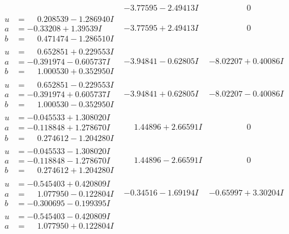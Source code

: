 \documentclass[1p]{elsarticle_modified}
\theoremstyle{definition}
\begin{document}
$$\begin{array}{c|c|c}
 & -3.77595 - 2.49413 I & \phantom{-0.000000 } 0 \\ \hline\begin{aligned}
u &= \phantom{-}0.208539 - 1.286940 I \\
a &= -0.33208 + 1.39539 I \\
b &= \phantom{-}0.471474 - 1.286510 I\end{aligned}
 & -3.77595 + 2.49413 I & \phantom{-0.000000 } 0 \\ \hline\begin{aligned}
u &= \phantom{-}0.652851 + 0.229553 I \\
a &= -0.391974 - 0.605737 I \\
b &= \phantom{-}1.000530 + 0.352950 I\end{aligned}
 & -3.94841 - 0.62805 I & -8.02207 + 0.40086 I \\ \hline\begin{aligned}
u &= \phantom{-}0.652851 - 0.229553 I \\
a &= -0.391974 + 0.605737 I \\
b &= \phantom{-}1.000530 - 0.352950 I\end{aligned}
 & -3.94841 + 0.62805 I & -8.02207 - 0.40086 I \\ \hline\begin{aligned}
u &= -0.045533 + 1.308020 I \\
a &= -0.118848 + 1.278670 I \\
b &= \phantom{-}0.274612 - 1.204280 I\end{aligned}
 & \phantom{-}1.44896 + 2.66591 I & \phantom{-0.000000 } 0 \\ \hline\begin{aligned}
u &= -0.045533 - 1.308020 I \\
a &= -0.118848 - 1.278670 I \\
b &= \phantom{-}0.274612 + 1.204280 I\end{aligned}
 & \phantom{-}1.44896 - 2.66591 I & \phantom{-0.000000 } 0 \\ \hline\begin{aligned}
u &= -0.545403 + 0.420809 I \\
a &= \phantom{-}1.077950 - 0.122804 I \\
b &= -0.300695 - 0.199395 I\end{aligned}
 & -0.34516 - 1.69194 I & -0.65997 + 3.30204 I \\ \hline\begin{aligned}
u &= -0.545403 - 0.420809 I \\
a &= \phantom{-}1.077950 + 0.122804 I \\

\end{aligned}
\end{array}$$
\end{document}
